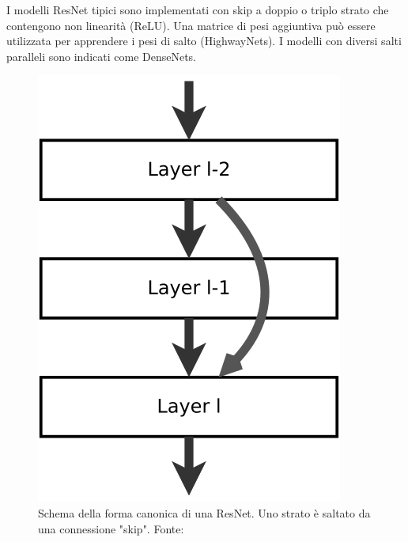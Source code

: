 \par I modelli ResNet tipici sono implementati con skip a doppio o triplo strato che contengono non linearità (ReLU). Una matrice di pesi aggiuntiva può essere utilizzata per apprendere i pesi di salto (HighwayNets). I modelli con diversi salti paralleli sono indicati come DenseNets. 

\begin{figure}[!htb]
	\centering
	\includegraphics[scale=0.45]{images/resnet1.png}
	\caption{Schema della forma canonica di una ResNet. Uno strato è saltato da una connessione "skip". Fonte: \cite{resnetWiki}}
	\label{fig:resnet-skip}
	\endminipage\hfill
	\centering

\end{figure}

